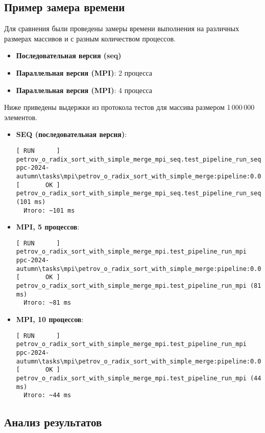 \documentclass[12pt]{article}
\begin{document}
\subsection{Пример замера времени}

Для сравнения были проведены замеры времени выполнения на различных размерах массивов и с разным количеством процессов.

\begin{itemize}
  \item \textbf{Последовательная версия (seq)}
  \item \textbf{Параллельная версия (MPI)}: 2 процесса
  \item \textbf{Параллельная версия (MPI)}: 4 процесса
\end{itemize}

Ниже приведены выдержки из протокола тестов для массива размером 1\,000\,000 элементов.

\begin{itemize}
  \item \textbf{SEQ (последовательная версия)}:
  \begin{verbatim}
[ RUN      ] petrov_o_radix_sort_with_simple_merge_mpi_seq.test_pipeline_run_seq
ppc-2024-autumn\tasks\mpi\petrov_o_radix_sort_with_simple_merge:pipeline:0.0952214000
[       OK ] petrov_o_radix_sort_with_simple_merge_mpi_seq.test_pipeline_run_seq (101 ms)
  Итого: ~101 ms
  \end{verbatim}

  \item \textbf{MPI, 5 процессов}:
  \begin{verbatim}
[ RUN      ] petrov_o_radix_sort_with_simple_merge_mpi.test_pipeline_run_mpi
ppc-2024-autumn\tasks\mpi\petrov_o_radix_sort_with_simple_merge:pipeline:0.0737897000
[       OK ] petrov_o_radix_sort_with_simple_merge_mpi.test_pipeline_run_mpi (81 ms)
  Итого: ~81 ms
  \end{verbatim}

  \item \textbf{MPI, 10 процессов}:
  \begin{verbatim}
[ RUN      ] petrov_o_radix_sort_with_simple_merge_mpi.test_pipeline_run_mpi
ppc-2024-autumn\tasks\mpi\petrov_o_radix_sort_with_simple_merge:pipeline:0.0375792000
[       OK ] petrov_o_radix_sort_with_simple_merge_mpi.test_pipeline_run_mpi (44 ms)
  Итого: ~44 ms
  \end{verbatim}
\end{itemize}

\subsection{Анализ результатов}
\end{document}
